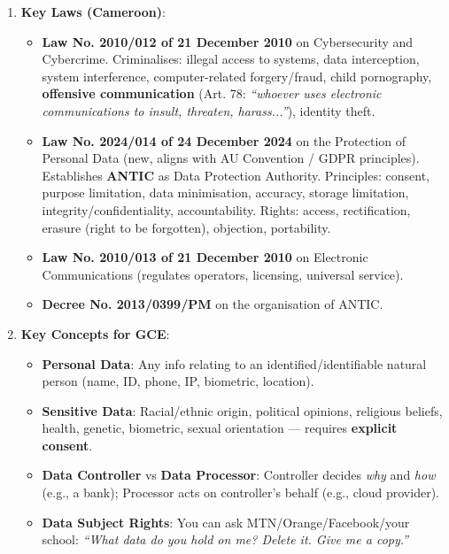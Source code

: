 \documentclass[11pt]{article}
\begin{document}
\begin{methode}
\begin{enumerate}
    \item \textbf{Key Laws (Cameroon)}:
          \begin{itemize}
              \item \textbf{Law No. 2010/012 of 21 December 2010} on Cybersecurity and Cybercrime. Criminalises: illegal access to systems, data interception, system interference, computer-related forgery/fraud, child pornography, \textbf{offensive communication} (Art. 78: \textit{``whoever uses electronic communications to insult, threaten, harass...''}), identity theft.
              \item \textbf{Law No. 2024/014 of 24 December 2024} on the Protection of Personal Data (new, aligns with AU Convention / GDPR principles). Establishes \textbf{ANTIC} as Data Protection Authority. Principles: consent, purpose limitation, data minimisation, accuracy, storage limitation, integrity/confidentiality, accountability. Rights: access, rectification, erasure (right to be forgotten), objection, portability.
              \item \textbf{Law No. 2010/013 of 21 December 2010} on Electronic Communications (regulates operators, licensing, universal service).
              \item \textbf{Decree No. 2013/0399/PM} on the organisation of ANTIC.
          \end{itemize}
    \item \textbf{Key Concepts for GCE}:
          \begin{itemize}
              \item \textbf{Personal Data}: Any info relating to an identified/identifiable natural person (name, ID, phone, IP, biometric, location).
              \item \textbf{Sensitive Data}: Racial/ethnic origin, political opinions, religious beliefs, health, genetic, biometric, sexual orientation — requires \textbf{explicit consent}.
              \item \textbf{Data Controller} vs \textbf{Data Processor}: Controller decides \textit{why} and \textit{how} (e.g., a bank); Processor acts on controller's behalf (e.g., cloud provider).
              \item \textbf{Data Subject Rights}: You can ask MTN/Orange/Facebook/your school: \textit{``What data do you hold on me? Delete it. Give me a copy.''}

\end{itemize}
\end{enumerate}
\end{methode}
\end{document}
